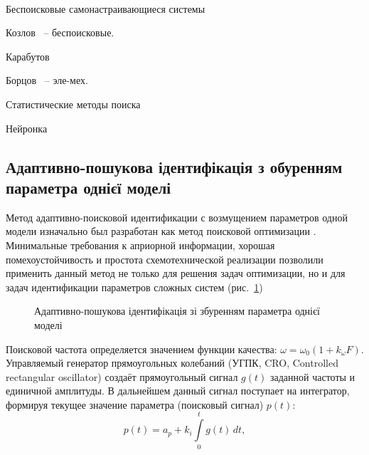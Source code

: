 ~\cite{medved_nepar_alg_id_nds}



Беспоисковые самонастраивающиеся системы~\cite{kozlov_nosearch_sns}

Козлов~\cite{kozlov_nosearch_sns} -- беспоисковые.

Карабутов~\cite{karabutov_adapt_id_sys,saliga_id_ctl_black}

Борцов~\cite{borcov} -- эле-мех.

Статистические методы поиска~\cite{rastr_stat_meth_search}

Нейронка~\cite{chen_nn_for_nls_mod,chen_nls_id_radial_basis,patra_nds_id_cheb,narendra_id_ctl_ds_nn,bodyan_adapt_viyavl}


\subsection{Адаптивно-пошукова ідентифікація з обуренням параметра однієї моделі}%

Метод адаптивно-поисковой идентификации с возмущением параметров одной модели
изначально был разработан как метод поисковой оптимизации
\cite{mich_92,ivah_int_meth_direct,mai_adopt_meth_direct,rastr_seu,kras_dyn_nsn,mai_iss_adop_alg_etalon,rastr_seu}.
Минимальные требования к априорной информации, хорошая помехоустойчивость и
простота схемотехнической реализации позволили применить данный метод не только
для решения задач оптимизации, но и для задач идентификации параметров сложных
систем
(рис.~\ref{atu:f:apid1})

\begin{figure}[htb!]
\begin{center}

\end{center}
\caption{Адаптивно-пошукова ідентифікація зі збуренням параметра однієї моделі}
\label{atu:f:apid1}
\end{figure}

Поисковой частота определяется
значением функции качества:
\( \omega = \omega_0 ( 1 + k_\omega F ) \).
Управляемый генератор прямоугольных колебаний (УГПК, CRO, Controlled rectangular oscillator)
создаёт прямоугольный сигнал \( g(t) \)
заданной частоты и единичной амплитуды.
В дальнейшем данный сигнал поступает на интегратор,
формируя текущее значение параметра (поисковый сигнал) \( p(t) \):
%
\begin{equation}
 p(t) = a_p + k_i \int\limits_{0}^{t} g(t) \, dt ,
\label{atu:eq:api_integr}
\end{equation}

